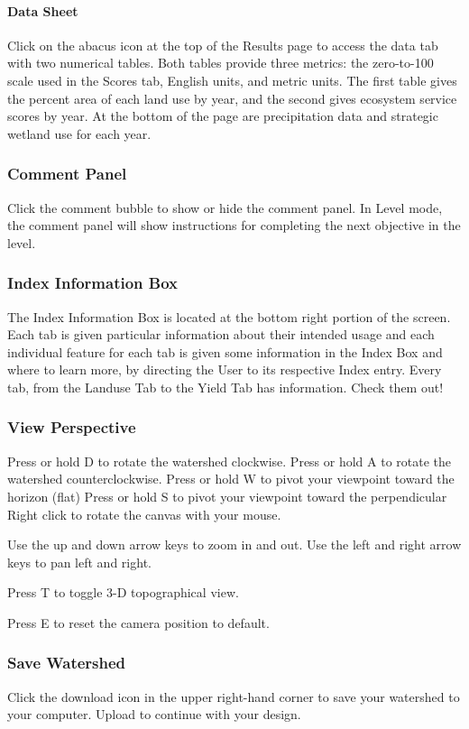 \documentclass[11pt]{article}
\begin{document}
\begin{itemize}
\paragraph{Data Sheet}
Click on the abacus icon at the top of the Results page to access the data tab with two numerical tables. Both tables provide three metrics: the zero-to-100 scale used in the Scores tab, English units, and metric units. The first table gives the percent area of each land use by year, and the second gives ecosystem service scores by year. At the bottom of the page are precipitation data and strategic wetland use for each year. 

\subsubsection{Comment Panel}
Click the comment bubble to show or hide the comment panel. In Level mode, the comment panel will show instructions for completing the next objective in the level. 

\subsubsection{Index Information Box}
The Index Information Box is located at the bottom right portion of the screen. Each tab is given particular information about their intended usage and each individual feature for each tab is given some information in the Index Box and where to learn more, by directing the User to its respective Index entry. Every tab, from the Landuse Tab to the Yield Tab has information. Check them out! 

\subsubsection{View Perspective}
Press or hold D to rotate the watershed clockwise.
Press or hold A to rotate the watershed counterclockwise.
Press or hold W to pivot your viewpoint toward the horizon (flat)
Press or hold S to pivot your viewpoint toward the perpendicular
Right click to rotate the canvas with your mouse.

Use the up and down arrow keys to zoom in and out.
Use the left and right arrow keys to pan left and right.

Press T to toggle 3-D topographical view.

Press E to reset the camera position to default.

\subsubsection{Save Watershed}
Click the download icon in the upper right-hand corner to save your watershed to your computer. Upload to continue with your design.


\end{itemize}
\end{document}
